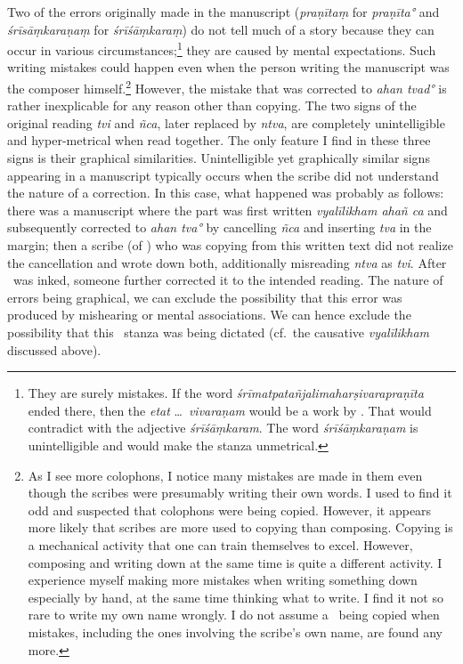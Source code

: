 Two of the errors originally made in the manuscript (\emph{praṇītaṃ} for \emph{praṇīta°} and \emph{śrīsāṃkaraṇaṃ} for \emph{śrīśāṃkaraṃ}) do not tell much of a story because they can occur in various circumstances;\footnote{They are surely mistakes. If the word \emph{śrīmatpatañjalimaharṣivarapraṇīta} ended there, then the \emph{etat} \ldots\ \emph{vivaraṇam} would be a work by \Patanjali. That would contradict with the adjective \emph{śrīśāṃkaram}. The word \emph{śrīśāṃkaraṇam} is unintelligible and would make the stanza unmetrical.} they are caused by mental expectations. Such writing mistakes could happen even when the person writing the manuscript was the composer himself.\footnote{As I see more colophons, I notice many mistakes are made in them even though the scribes were presumably writing their own words. I used to find it odd and suspected that colophons were being copied. However, it appears more likely that scribes are more used to copying than composing. Copying is a mechanical activity that one can train themselves to excel. However, composing and writing down at the same time is quite a different activity. I experience myself making more mistakes when writing something down especially by hand, at the same time thinking what to write. I find it not so rare to write my own name wrongly. I do not assume a \colophon\ being copied when mistakes, including the ones involving the scribe's own name, are found any more.} 
%
However, the mistake that was corrected to \emph{ahan tvad°} is rather inexplicable for any reason other than copying. The two signs of the original reading \emph{tvi} and \emph{ñca}, later replaced by \emph{ntva}, are completely unintelligible and hyper-metrical when read together. The only feature I find in these three signs is their graphical similarities. Unintelligible yet graphically similar signs appearing in a manuscript typically occurs when the scribe did not understand the nature of a correction. In this case, what happened was probably as follows: there was a manuscript where the part was first written \emph{vyalīlikham ahañ ca} and subsequently corrected to \emph{ahan tva°} by cancelling \emph{ñca} and inserting \emph{tva} in the margin; then a scribe (of \Tm) who was copying from this written text did not realize the cancellation and wrote down both, additionally misreading \emph{ntva} as \emph{tvi}. After \Tm\ was inked, someone further corrected it to the intended reading. The nature of errors being graphical, we can exclude the possibility that this error was produced by mishearing or mental associations. We can hence exclude the possibility that this \colophon\ stanza was being dictated (cf.\ the causative \emph{vyalīlikham} discussed above). 

